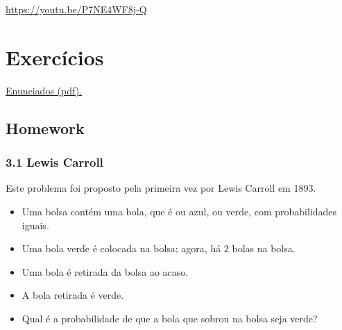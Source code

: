 \documentclass[
  11pt]{report}
\begin{document}
\begin{center} \url{https://youtu.be/P7NE4WF8j-Q} \end{center}

\hypertarget{exercuxedcios-3}{%
\section*{Exercícios}\label{exercuxedcios-3}}

\href{https://projects.iq.harvard.edu/files/stat110/files/strategic_practice_and_homework_2.pdf}{Enunciados (pdf).}

\hypertarget{homework-1}{%
\subsection*{Homework}\label{homework-1}}

\hypertarget{lewis-carroll}{%
\subsubsection*{3.1 Lewis Carroll}\label{lewis-carroll}}

\begin{rmdbox}

Este problema foi proposto pela primeira vez por Lewis Carroll em 1893.

\begin{itemize}
\item
  Uma bolsa contém uma bola, que é ou azul, ou verde, com probabilidades iguais.
\item
  Uma bola verde é colocada na bolsa; agora, há $2$ bolas na bolsa.
\item
  Uma bola é retirada da bolsa ao acaso.
\item
  A bola retirada é verde.
\item
  Qual é a probabilidade de que a bola que sobrou na bolsa seja verde?
\end{itemize}

\end{rmdbox}
\end{document}
